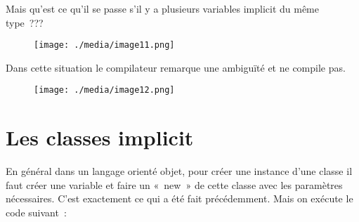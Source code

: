 \documentclass[12pt]{article}
\begin{document}
Mais qu’est ce qu’il se passe s’il y a plusieurs variables implicit du même type ???\par




\begin{figure}[H]
	\begin{Center}
		\texttt{[image: ./media/image11.png]}
	\end{Center}
\end{figure}



\par


\vspace{\baselineskip}
Dans cette situation le compilateur remarque une ambiguïté et ne compile pas.\par


\vspace{\baselineskip}



\begin{figure}[H]
	\begin{Center}
		\texttt{[image: ./media/image12.png]}
	\end{Center}
\end{figure}



\par


\vspace{\baselineskip}
\section*{Les classes implicit}

\vspace{\baselineskip}
En général dans un langage orienté objet, pour créer une instance d’une classe il faut créer une variable et faire un « new » de cette classe avec les paramètres nécessaires. C’est exactement ce qui a été fait précédemment. Mais on exécute le code suivant : \par
\end{document}
